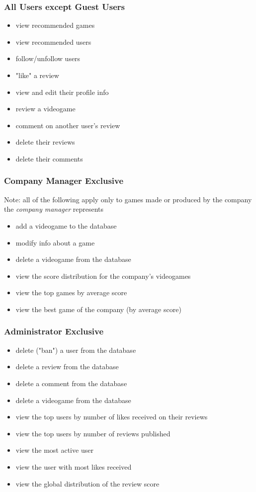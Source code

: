 \subsubsection{All Users except Guest Users}
\begin{itemize}
        \item view recommended games
	\item view recommended users
        \item follow/unfollow users
        \item "like" a review
	\item view and edit their profile info
        \item review a videogame
	\item comment on another user's review
	\item delete their reviews
	\item delete their comments
\end{itemize}
\subsubsection{Company Manager Exclusive}
Note: all of the following apply only to games made or produced by the company the \emph{company manager} represents 
\begin{itemize}
	\item add a videogame to the database 
	\item modify info about a game 
	\item delete a videogame from the database 
	\item view the score distribution for the company's videogames
	\item view the top games by average score
	\item view the best game of the company (by average score)
\end{itemize}
\subsubsection{Administrator Exclusive}
\begin{itemize}
	\item delete ("ban") a user from the database
	\item delete a review from the database
	\item delete a comment from the database
	\item delete a videogame from the database 
	\item view the top users by number of likes received on their reviews
	\item view the top users by number of reviews published
	\item view the most active user
	\item view the user with most likes received
	\item view the global distribution of the review score
\end{itemize}
